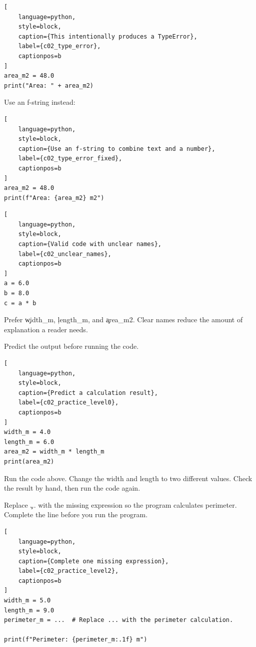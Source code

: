 \begin{lstlisting}[
    language=python,
    style=block,
    caption={This intentionally produces a TypeError},
    label={c02_type_error},
    captionpos=b
]
area_m2 = 48.0
print("Area: " + area_m2)
\end{lstlisting}

Use an f-string instead:

\begin{lstlisting}[
    language=python,
    style=block,
    caption={Use an f-string to combine text and a number},
    label={c02_type_error_fixed},
    captionpos=b
]
area_m2 = 48.0
print(f"Area: {area_m2} m2")
\end{lstlisting}


\begin{lstlisting}[
    language=python,
    style=block,
    caption={Valid code with unclear names},
    label={c02_unclear_names},
    captionpos=b
]
a = 6.0
b = 8.0
c = a * b
\end{lstlisting}

Prefer \c{width_m}, \c{length_m}, and \c{area_m2}. Clear names reduce the
amount of explanation a reader needs.



Predict the output before running the code.

\begin{lstlisting}[
    language=python,
    style=block,
    caption={Predict a calculation result},
    label={c02_practice_level0},
    captionpos=b
]
width_m = 4.0
length_m = 6.0
area_m2 = width_m * length_m
print(area_m2)
\end{lstlisting}


Run the code above. Change the width and length to two different values. Check
the result by hand, then run the code again.


Replace \c{...} with the missing expression so the program calculates
perimeter. Complete the line before you run the program.

\begin{lstlisting}[
    language=python,
    style=block,
    caption={Complete one missing expression},
    label={c02_practice_level2},
    captionpos=b
]
width_m = 5.0
length_m = 9.0
perimeter_m = ...  # Replace ... with the perimeter calculation.

print(f"Perimeter: {perimeter_m:.1f} m")
\end{lstlisting}

